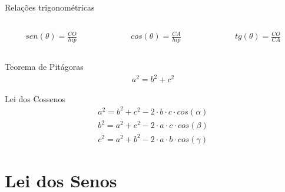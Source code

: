 \documentclass[handout]{beamer}
\begin{document}
\begin{frame}\frametitle{\subsecname}
    \begin{block}{Relações trigonométricas}
        \begin{columns}
            \begin{column}{0.2\textwidth}
                \begin{align*}
                    sen(\theta) = \frac{CO}{hip}
                \end{align*}
            \end{column} 
            \begin{column}{0.2\textwidth}
                \begin{align*}
                    cos(\theta) = \frac{CA}{hip}
                \end{align*}
            \end{column} 
            \begin{column}{0.2\textwidth}
                \begin{align*}
                    tg(\theta) = \frac{CO}{CA}
                \end{align*}
            \end{column} 

        \end{columns}
    \end{block}

    \begin{block}{Teorema de Pitágoras}
        \begin{align*}
            a^2 = b^2 + c^2
        \end{align*}
    \end{block}

    \begin{block}{Lei dos Cossenos}
        \begin{align*}
            a^2 = b^2 + c^2 - 2\cdot b\cdot c\cdot cos(\alpha)\\
            b^2 = a^2 + c^2 - 2\cdot a\cdot c\cdot cos(\beta)\\ 
            c^2 = a^2 + b^2 - 2\cdot a\cdot b\cdot cos(\gamma)   
        \end{align*}
    \end{block}


\end{frame}



\section{Lei dos Senos}
\end{document}
